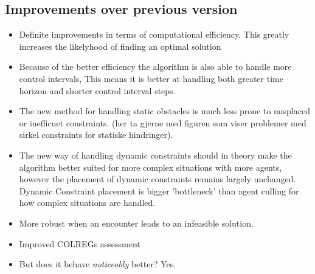 \subsection{Improvements over previous version}
\begin{itemize}
    \item Definite improvements in terms of computational efficiency. This greatly increases the likelyhood of finding an optimal solution 
    \item Because of the better efficiency the algorithm is also able to handle more control intervals, This means it is better at handling both greater time horizon and shorter control interval steps.
    \item The new method for handling static obstacles is much less prone to misplaced or inefficnet constraints. (her ta gjerne med figuren som viser problemer med sirkel constraints for statiske hindringer).
    \item The new way of handling dynamic constraints should in theory make the algorithm better suited for more complex situations with more agents, however the placement of dynamic constraints remains largely unchanged.
    Dynamic Constraint placement is bigger 'bottleneck' than agent culling for how complex situations are handled. 
    \item More robust when an encounter leads to an infeasible solution.
    \item Improved COLREGs assessment
    \item But does it behave \textit{noticeably} better? Yes.
\end{itemize}

\newpage